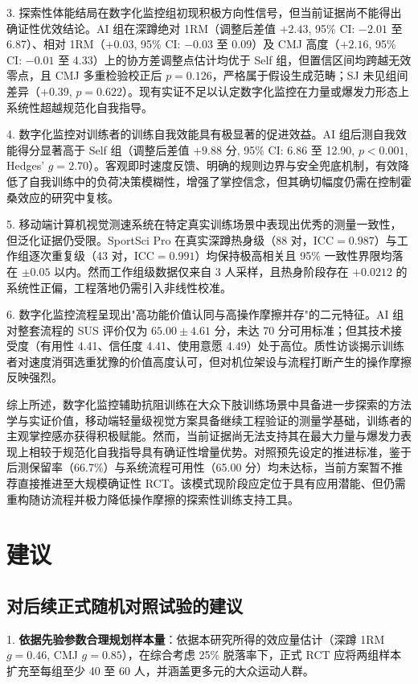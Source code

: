 \documentclass[UTF8,zihao=-4,twoside,openany]{ctexbook}
\begin{document}
3. 探索性体能结局在数字化监控组初现积极方向性信号，但当前证据尚不能得出确证性优效结论。AI 组在深蹲绝对 1RM（调整后差值 $+2.43$, 95\% CI: $-2.01$ 至 6.87）、相对 1RM（$+0.03$, 95\% CI: $-0.03$ 至 0.09）及 CMJ 高度（$+2.16$, 95\% CI: $-0.01$ 至 4.33）上的协方差调整点估计均优于 Self 组，但置信区间均跨越无效零点，且 CMJ 多重检验校正后 $p=0.126$，严格属于假设生成范畴；SJ 未见组间差异（$+0.39$, $p=0.622$）。现有实证不足以认定数字化监控在力量或爆发力形态上系统性超越规范化自我指导。

4. 数字化监控对训练者的训练自我效能具有极显著的促进效益。AI 组后测自我效能得分显著高于 Self 组（调整后差值 $+9.88$ 分, 95\% CI: 6.86 至 12.90, $p<0.001$, Hedges' $g=2.70$）。客观即时速度反馈、明确的规则边界与安全兜底机制，有效降低了自我训练中的负荷决策模糊性，增强了掌控信念，但其确切幅度仍需在控制霍桑效应的研究中复核。

5. 移动端计算机视觉测速系统在特定真实训练场景中表现出优秀的测量一致性，但泛化证据仍受限。SportSci Pro 在真实深蹲热身级（88 对，$\text{ICC}=0.987$）与工作组逐次重复级（43 对，$\text{ICC}=0.991$）均保持极高相关且 95\% 一致性界限均落在 $\pm 0.05$ 以内。然而工作组级数据仅来自 3 人采样，且热身阶段存在 $+0.0212$ 的系统性正偏，工程落地仍需引入非线性校准。

6. 数字化监控流程呈现出"高功能价值认同与高操作摩擦并存"的二元特征。AI 组对整套流程的 SUS 评价仅为 $65.00 \pm 4.61$ 分，未达 70 分可用标准；但其技术接受度（有用性 4.41、信任度 4.41、使用意愿 4.49）处于高位。质性访谈揭示训练者对速度消弭选重犹豫的价值高度认可，但对机位架设与流程打断产生的操作摩擦反映强烈。

综上所述，数字化监控辅助抗阻训练在大众下肢训练场景中具备进一步探索的方法学与实证价值，移动端轻量级视觉方案具备继续工程验证的测量学基础，训练者的主观掌控感亦获得积极赋能。然而，当前证据尚无法支持其在最大力量与爆发力表现上相较于规范化自我指导具有确证性增量优势。对照预先设定的推进标准，鉴于后测保留率（66.7\%）与系统流程可用性（65.00 分）均未达标，当前方案暂不推荐直接推进至大规模确证性 RCT。该模式现阶段应定位于具有应用潜能、但仍需重构随访流程并极力降低操作摩擦的探索性训练支持工具。

\section{建议}

\subsection{对后续正式随机对照试验的建议}
1. \textbf{依据先验参数合理规划样本量}：依据本研究所得的效应量估计（深蹲 1RM $g=0.46$, CMJ $g=0.85$），在综合考虑 25\% 脱落率下，正式 RCT 应将两组样本扩充至每组至少 40 至 60 人，并涵盖更多元的大众运动人群。
\end{document}
